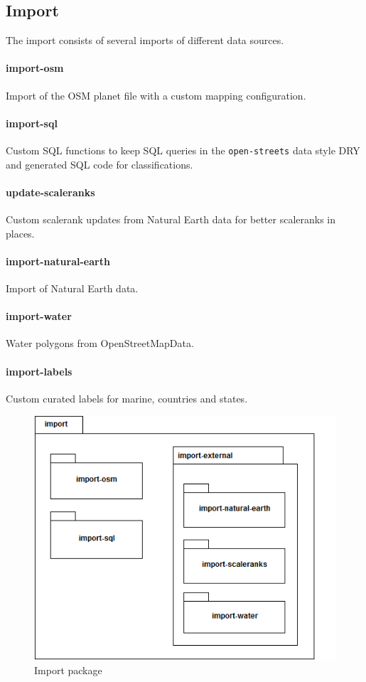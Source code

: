 \newpage
\subsection{Import}

The import consists of several imports of different data sources.

\paragraph{import-osm}
Import of the OSM planet file with a custom mapping configuration.

\paragraph{import-sql}
Custom SQL functions to keep SQL queries in the \texttt{open-streets} data style DRY and generated SQL code for classifications. 

\paragraph{update-scaleranks}
Custom scalerank updates from Natural Earth data for better scaleranks in places.

\paragraph{import-natural-earth}
Import of Natural Earth data.

\paragraph{import-water}
Water polygons from OpenStreetMapData.

\paragraph{import-labels}
Custom curated labels for marine, countries and states.

\begin{figure}[H]
\centering
  \includegraphics[scale=0.6]{images/import_export_package_diagram.png}
  \caption{Import package}
\end{figure}


